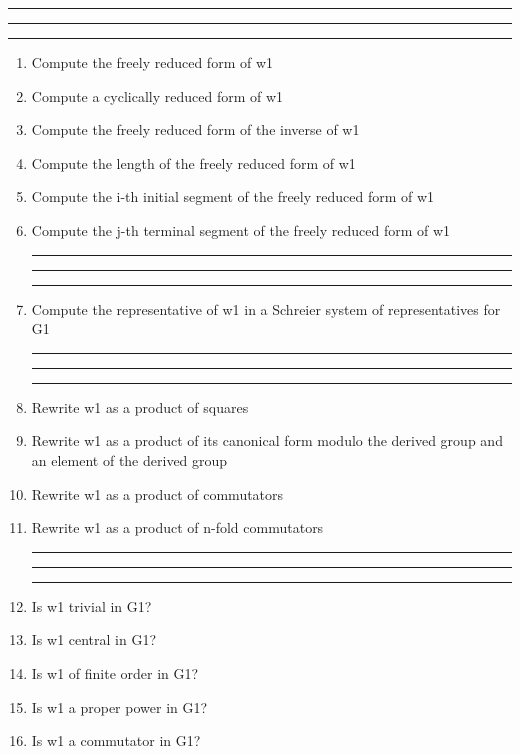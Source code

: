 
\bigskip
\hrule\hrule\hrule

\begin{enumerate}

\item Compute the freely reduced form of w1

\item Compute a cyclically reduced form of w1

\item Compute the freely reduced form of the inverse of w1

\item Compute the length of the freely reduced form of w1

\item Compute the i-th initial segment of the freely reduced form of w1

\item Compute the j-th terminal segment of the freely reduced form of w1

\bigskip
\hrule\hrule\hrule

\item Compute the representative of w1 in a Schreier system of representatives for
G1

\bigskip
\hrule\hrule\hrule

\item Rewrite w1 as a product of squares

\item Rewrite w1 as a product of its canonical form modulo the derived group
and an element of the derived group

\item Rewrite w1 as a product of commutators

\item Rewrite w1 as a product of n-fold commutators

\bigskip
\hrule\hrule\hrule

\item Is w1 trivial in G1?

\item Is w1 central in G1?

\item Is w1 of finite order in G1?

\item Is w1 a proper power in G1?

\item Is w1 a commutator in G1?


\end{enumerate}
